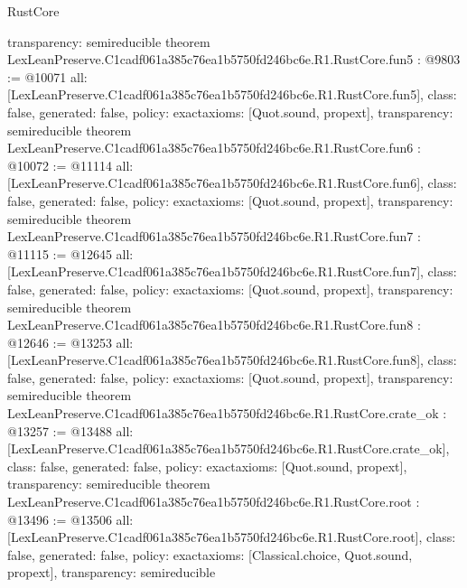 \begin{lexlean}{RustCore}
\begin{coremodule}
{  transparency: semireducible
}
theorem LexLeanPreserve.C1cadf061a385c76ea1b5750fd246bc6e.R1.RustCore.fun5 : @9803 := @10071 {
  all: [LexLeanPreserve.C1cadf061a385c76ea1b5750fd246bc6e.R1.RustCore.fun5],
  class: false,
  generated: false,
  policy: exact{axioms: [Quot.sound, propext]},
  transparency: semireducible
}
theorem LexLeanPreserve.C1cadf061a385c76ea1b5750fd246bc6e.R1.RustCore.fun6 : @10072 := @11114 {
  all: [LexLeanPreserve.C1cadf061a385c76ea1b5750fd246bc6e.R1.RustCore.fun6],
  class: false,
  generated: false,
  policy: exact{axioms: [Quot.sound, propext]},
  transparency: semireducible
}
theorem LexLeanPreserve.C1cadf061a385c76ea1b5750fd246bc6e.R1.RustCore.fun7 : @11115 := @12645 {
  all: [LexLeanPreserve.C1cadf061a385c76ea1b5750fd246bc6e.R1.RustCore.fun7],
  class: false,
  generated: false,
  policy: exact{axioms: [Quot.sound, propext]},
  transparency: semireducible
}
theorem LexLeanPreserve.C1cadf061a385c76ea1b5750fd246bc6e.R1.RustCore.fun8 : @12646 := @13253 {
  all: [LexLeanPreserve.C1cadf061a385c76ea1b5750fd246bc6e.R1.RustCore.fun8],
  class: false,
  generated: false,
  policy: exact{axioms: [Quot.sound, propext]},
  transparency: semireducible
}
theorem LexLeanPreserve.C1cadf061a385c76ea1b5750fd246bc6e.R1.RustCore.crate_ok : @13257 := @13488 {
  all: [LexLeanPreserve.C1cadf061a385c76ea1b5750fd246bc6e.R1.RustCore.crate_ok],
  class: false,
  generated: false,
  policy: exact{axioms: [Quot.sound, propext]},
  transparency: semireducible
}
theorem LexLeanPreserve.C1cadf061a385c76ea1b5750fd246bc6e.R1.RustCore.root : @13496 := @13506 {
  all: [LexLeanPreserve.C1cadf061a385c76ea1b5750fd246bc6e.R1.RustCore.root],
  class: false,
  generated: false,
  policy: exact{axioms: [Classical.choice, Quot.sound, propext]},
  transparency: semireducible
}


\end{coremodule}
\end{lexlean}
